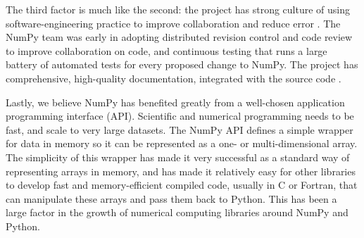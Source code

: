 The third factor is much like the second: 
the project has strong culture of using software-engineering practice to
improve collaboration and reduce error \cite{millman2014developing}.
The NumPy team was early in adopting distributed
revision control and code review to improve collaboration on code, and
continuous testing that runs a large battery of automated tests for every proposed
change to NumPy.
The project has comprehensive, high-quality documentation,
integrated with the source
code \cite{vanderwalt2008scipy,harrington2008scipy,harrington2009scipy}. 

Lastly, we believe NumPy has benefited greatly from a well-chosen application
programming interface (API).  Scientific and numerical programming needs to be
fast, and scale to very large datasets.  The NumPy API defines a simple wrapper
for data in memory so it can be represented as a one- or multi-dimensional
array.  The simplicity of this wrapper has made it very successful as a
standard way of representing arrays in memory, and has made it relatively easy
for other libraries to develop fast and memory-efficient compiled code, usually
in C or Fortran, that can manipulate these arrays and pass them back to Python.
This has been a large factor in the growth of numerical computing libraries
around NumPy and Python.


%
%
%
%
%
%

